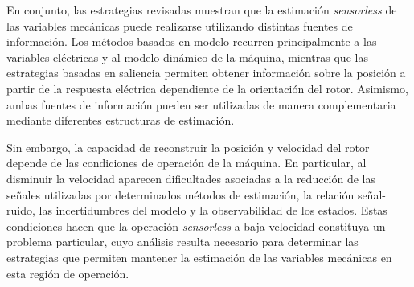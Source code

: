 En conjunto, las estrategias revisadas muestran que la estimación \textit{sensorless} de las variables mecánicas puede realizarse utilizando distintas fuentes de información. Los métodos basados en modelo recurren principalmente a las variables eléctricas y al modelo dinámico de la máquina, mientras que las estrategias basadas en saliencia permiten obtener información sobre la posición a partir de la respuesta eléctrica dependiente de la orientación del rotor. Asimismo, ambas fuentes de información pueden ser utilizadas de manera complementaria mediante diferentes estructuras de estimación.

Sin embargo, la capacidad de reconstruir la posición y velocidad del rotor depende de las condiciones de operación de la máquina. En particular, al disminuir la velocidad aparecen dificultades asociadas a la reducción de las señales utilizadas por determinados métodos de estimación, la relación señal-ruido, las incertidumbres del modelo y la observabilidad de los estados. Estas condiciones hacen que la operación \textit{sensorless} a baja velocidad constituya un problema particular, cuyo análisis resulta necesario para determinar las estrategias que permiten mantener la estimación de las variables mecánicas en esta región de operación. 


